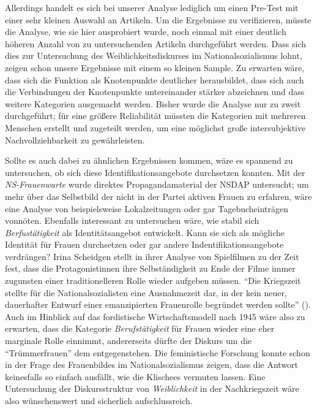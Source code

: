 \documentclass[12pt, titlepage=true, toc=bib]{scrartcl}
\begin{document}
Allerdings handelt es sich bei unserer Analyse lediglich um einen Pre-Test mit einer sehr kleinen Auswahl an Artikeln. Um die Ergebnisse zu verifizieren, müsste die Analyse, wie sie hier ausprobiert wurde, noch einmal mit einer deutlich höheren Anzahl von zu untersuchenden Artikeln durchgeführt werden. Dass sich dies zur Untersuchung des Weiblichkeitsdiskurses im Nationalsozialismus lohnt, zeigen schon unsere Ergebnisse mit einem so kleinen Sample. Zu erwarten wäre, dass sich die Funktion als Knotenpunkte deutlicher herausbildet, dass sich auch die Verbindungen der Knotenpunkte untereinander stärker abzeichnen und dass weitere Kategorien ausgemacht werden. Bisher wurde die Analyse nur zu zweit durchgeführt; für eine größere Reliabilität müssten die Kategorien mit mehreren Menschen erstellt und zugeteilt werden, um eine möglichst große intersubjektive Nachvollziehbarkeit zu gewährleisten.

Sollte es auch dabei zu ähnlichen Ergebnissen kommen, wäre es spannend zu untersuchen, ob sich diese Identifikationsangebote durchsetzen konnten. Mit der \textit{NS-Frauenwarte} wurde direktes Propagandamaterial der NSDAP untersucht; um mehr über das Selbstbild der nicht in der Partei aktiven Frauen zu erfahren, wäre eine Analyse von beispielsweise Lokalzeitungen oder gar Tagebucheinträgen vonnöten. Ebenfalls interessant zu untersuchen wäre, wie stabil sich \textit{Berfustätigkeit} als Identitätsangebot entwickelt. Kann sie sich als mögliche Identität für Frauen durchsetzen oder gar andere Indentifikationsangebote verdrängen? Irina Scheidgen stellt in ihrer Analyse von Spielfilmen zu der Zeit fest, dass die Protagonistinnen ihre Selbständigkeit zu Ende der Filme immer zugunsten einer traditionelleren Rolle wieder aufgeben müssen. "`Die Kriegszeit stellte für die Nationalsozialisten eine Ausnahmezeit dar, in der kein neuer, dauerhafter Entwurf einer emanzipierten Frauenrolle begründet werden sollte"' (\cite[278]{scheidgen_frauenbilder_2015}). Auch im Hinblick auf das fordistische Wirtschaftsmodell nach 1945 wäre also zu erwarten, dass die Kategorie \textit{Berufstätigkeit} für Frauen wieder eine eher marginale Rolle einnimmt, andererseits dürfte der Diskurs um die "`Trümmerfrauen"' dem entgegenstehen. Die feministische Forschung konnte schon in der Frage des Frauenbildes im Nationalsozialismus zeigen, dass die Antwort keinesfalls so einfach ausfällt, wie die Klischees vermuten lassen. Eine Untersuchung der Diskursstruktur von \textit{Weiblichkeit} in der Nachkriegszeit wäre also wünschenswert und sicherlich aufschlussreich.
\end{document}
